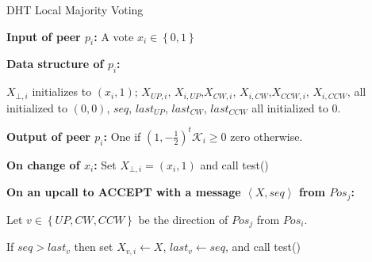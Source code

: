 \documentclass[12pt,english,journal]{elsarticle}
\numberwithin{equation}{section}
\numberwithin{figure}{section}
\theoremstyle{plain}
\theoremstyle{plain}
\begin{document}
\begin{algorithm}
\caption{\label{alg:DHT-Majority-Voting}DHT Local Majority Voting}


\noindent \begin{raggedright}
\textbf{Input of peer $p_{i}$: }A vote $x_{i}\in\left\{ 0,1\right\} $
\par\end{raggedright}

\noindent \begin{raggedright}
\textbf{Data structure of $p_{i}$:}
\par\end{raggedright}

\noindent \begin{raggedright}
$X_{\bot,i}$ initializes to $\left(x_{i},1\right)$; $X_{UP,i}$,
$X_{i,UP}$,$X_{CW,i}$, $X_{i,CW}$,$X_{CCW,i}$, $X_{i,CCW}$, all
initialized to $\left(0,0\right)$, $seq$, $last_{UP}$, $last_{CW}$,
$last_{CCW}$ all initialized to 0.
\par\end{raggedright}

\noindent \begin{raggedright}
\textbf{Output of peer $p_{i}$:} One if $\left(1,-\frac{1}{2}\right)^{t}\mathcal{K}_{i}\geq0$
zero otherwise.
\par\end{raggedright}

\noindent \begin{raggedright}
\textbf{On change of $x_{i}$: }Set $X_{\bot,i}=\left(x_{i},1\right)$
and call test()
\par\end{raggedright}

\noindent \begin{raggedright}
\textbf{On an upcall to ACCEPT with a message $\left\langle X,seq\right\rangle $
from $Pos_{j}$:}
\par\end{raggedright}

\noindent \begin{raggedright}
Let $v\in\left\{ UP,CW,CCW\right\} $ be the direction of $Pos_{j}$
from $Pos_{i}$.
\par\end{raggedright}

\noindent \begin{raggedright}
If $seq>last_{v}$ then set $X_{v,i}\leftarrow X$, $last_{v}\leftarrow seq$,
and call test()
\par\end{raggedright}


\end{algorithm}
\end{document}
